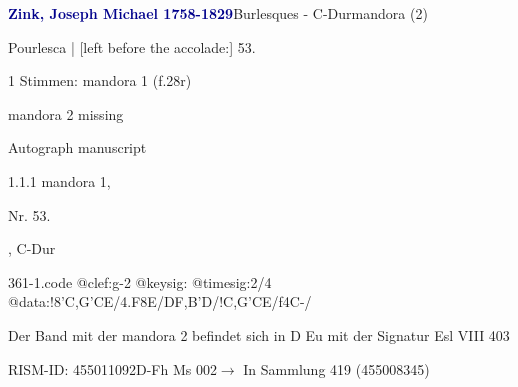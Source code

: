 \documentclass[twocolumn]{book}
\begin{document}
\par \vspace{7pt} \textcolor{darkblue}{\textbf{Zink, Joseph Michael  1758-1829}}\hfillplus{\textbf{[361]}}\newline Burlesques - C-Dur\newline mandora (2)
\par \begin{itshape}[f.28r, at left:] Pourlesca | [left before the accolade:] 53.\end{itshape} 
\par \textcolor{darkblue}{}  1 Stimmen: mandora 1  (f.28r)\newline \begin{small} mandora 2 missing\end{small} \newline Autograph manuscript
\par 1.1.1  mandora 1, \begin{itshape}Nr. 53.\end{itshape}, C-Dur  
\begin{filecontents*}{361-1.code}
@clef:g-2
@keysig:
@timesig:2/4
@data:!8'C,G'CE/4.F8E/DF{,B'D}/!C,G'CE/f4C-/
\end{filecontents*}
\newline
%
\par Der Band mit der mandora 2 befindet sich in D Eu mit der Signatur Esl VIII 403
\par RISM-ID: 455011092\newline D-Fh  Ms 002\newline $\rightarrow$ In Sammlung 419 (455008345)
      
\end{document}
